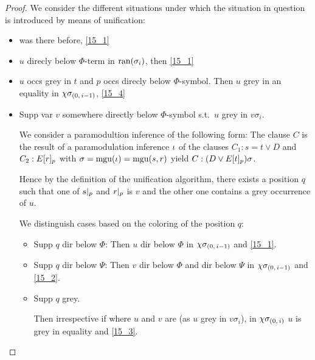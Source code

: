 \documentclass[,%
	draft=false,%
	numbers=noendperiod
	12pt,
	a4paper,
	oneside,%
	openany,
]{memoir}
\newcommand{\inv}{\ensuremath{\chi}}
\begin{document}
\begin{proof}
	We consider the different situations under which the situation in question is introduced by means of unification: 
	\begin{itemize}
		\item
			was there before, \ref{15_1}

		\item
			$u$ direcly below $\Phi$-term in $\operatorname{ran}(\sigma_i)$, then \ref{15_1}

		\item
			$u$ occs grey in $t$ and $p$ occs direcly below $\Phi$-symbol.
			Then $u$ grey in an equality in $\inv\sigmazmi$, \ref{15_4}

		\item
			Supp var $v$ somewhere directly below $\Phi$-symbol s.t.\ $u$ grey in $v\sigma_i$.

			We consider a paramodultion inference of the following form:
			The clause $C$ is the result of a paramodulation inference\nolinebreak{} $\iota$ of
			the clauses $C_1: s=t \lor D$ and $C_2: E{[r]_{p}}$ with $\sigma=\operatorname{mgu}(\iota)=\operatorname{mgu}(s, r)$ yield $C: (D\lor E{[t]_{p}})\sigma$.

			Hence by the definition of the unification algorithm, there exists a position $q$ such that one of $s|_{p}$ and $r|_{p}$ is $v$ and the other one contains a grey occurrence of $u$.

			We distinguish cases based on the coloring of the position $q$:

			\begin{itemize}
				\item Supp $q$ dir below $\Phi$: Then $u$ dir below $\Phi$ in $\inv\sigmazmi$ and \ref{15_1}.
				\item Supp $q$ dir below $\Psi$: Then $v$ dir below $\Phi$ and dir below $\Psi$ in $\inv\sigmazmi$ and \ref{15_2}.
				\item Supp $q$ grey.

					Then irrespective if where $u$ and $v$ are (as $u$ grey in $v\sigma_i$), in $\inv\sigmazi$ $u$ is grey in equality and \ref{15_3}.
			\end{itemize}



	\end{itemize}
\end{proof}
\cbend
\end{document}

